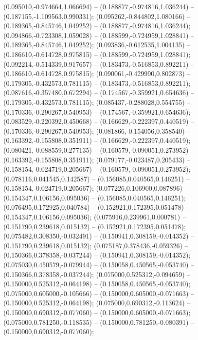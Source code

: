  (0.095010,-0.974664,1.066694) -- (0.188877,-0.974816,1.036244) -- (0.187155,-1.109563,0.990331);
 (0.095262,-0.844802,1.080166) -- (0.189365,-0.845746,1.049252) -- (0.188877,-0.974816,1.036244);
 (0.094866,-0.723308,1.059028) -- (0.188599,-0.724959,1.028841) -- (0.189365,-0.845746,1.049252);
 (0.093836,-0.612535,1.004135) -- (0.186610,-0.614728,0.975815) -- (0.188599,-0.724959,1.028841);
 (0.092214,-0.514339,0.917657) -- (0.183473,-0.516853,0.892211) -- (0.186610,-0.614728,0.975815);
 (0.090061,-0.429990,0.802873) -- (0.179305,-0.432573,0.781115) -- (0.183473,-0.516853,0.892211);
 (0.087616,-0.357480,0.672294) -- (0.174567,-0.359921,0.654636) -- (0.179305,-0.432573,0.781115);
 (0.085437,-0.288028,0.554755) -- (0.170336,-0.290267,0.540953) -- (0.174567,-0.359921,0.654636);
 (0.083529,-0.220392,0.450668) -- (0.166629,-0.222397,0.440519) -- (0.170336,-0.290267,0.540953);
 (0.081866,-0.154056,0.358540) -- (0.163392,-0.155808,0.351911) -- (0.166629,-0.222397,0.440519);
 (0.080421,-0.088559,0.277135) -- (0.160579,-0.090051,0.273952) -- (0.163392,-0.155808,0.351911);
 (0.079177,-0.023487,0.205433) -- (0.158154,-0.024719,0.205667) -- (0.160579,-0.090051,0.273952);
 (0.078116,0.041545,0.142587) -- (0.156085,0.040565,0.146251) -- (0.158154,-0.024719,0.205667);
 (0.077226,0.106900,0.087896) -- (0.154347,0.106156,0.095036) -- (0.156085,0.040565,0.146251);
 (0.076495,0.172925,0.040784) -- (0.152921,0.172395,0.051478) -- (0.154347,0.106156,0.095036);
 (0.075916,0.239961,0.000781) -- (0.151790,0.239618,0.015132) -- (0.152921,0.172395,0.051478);
 (0.075482,0.308350,-0.032491) -- (0.150941,0.308159,-0.014352) -- (0.151790,0.239618,0.015132);
 (0.075187,0.378436,-0.059326) -- (0.150366,0.378358,-0.037244) -- (0.150941,0.308159,-0.014352);
 (0.075030,0.450579,-0.079944) -- (0.150058,0.450565,-0.053740) -- (0.150366,0.378358,-0.037244);
 (0.075000,0.525312,-0.094659) -- (0.150000,0.525312,-0.064198) -- (0.150058,0.450565,-0.053740);
 (0.075000,0.605000,-0.105666) -- (0.150000,0.605000,-0.071663) -- (0.150000,0.525312,-0.064198);
 (0.075000,0.690312,-0.113624) -- (0.150000,0.690312,-0.077060) -- (0.150000,0.605000,-0.071663);
 (0.075000,0.781250,-0.118535) -- (0.150000,0.781250,-0.080391) -- (0.150000,0.690312,-0.077060);
